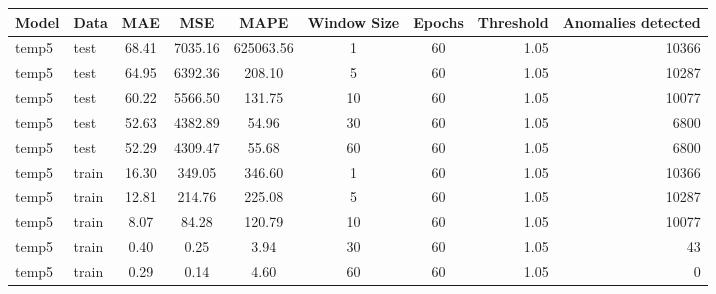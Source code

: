 \begin{tabular}{llcccccrr}
\hline
Model & Data & MAE & MSE & MAPE & Window Size & Epochs & Threshold & Anomalies detected \\
\hline
temp5 & test & 68.41 & 7035.16 & 625063.56 & 1 & 60 & 1.05 & 10366 \\
temp5 & test & 64.95 & 6392.36 & 208.10 & 5 & 60 & 1.05 & 10287 \\
temp5 & test & 60.22 & 5566.50 & 131.75 & 10 & 60 & 1.05 & 10077 \\
temp5 & test & 52.63 & 4382.89 & 54.96 & 30 & 60 & 1.05 & 6800 \\
temp5 & test & 52.29 & 4309.47 & 55.68 & 60 & 60 & 1.05 & 6800 \\
temp5 & train & 16.30 & 349.05 & 346.60 & 1 & 60 & 1.05 & 10366 \\
temp5 & train & 12.81 & 214.76 & 225.08 & 5 & 60 & 1.05 & 10287 \\
temp5 & train & 8.07 & 84.28 & 120.79 & 10 & 60 & 1.05 & 10077 \\
temp5 & train & 0.40 & 0.25 & 3.94 & 30 & 60 & 1.05 & 43 \\
temp5 & train & 0.29 & 0.14 & 4.60 & 60 & 60 & 1.05 & 0 \\
\hline
\end{tabular}
